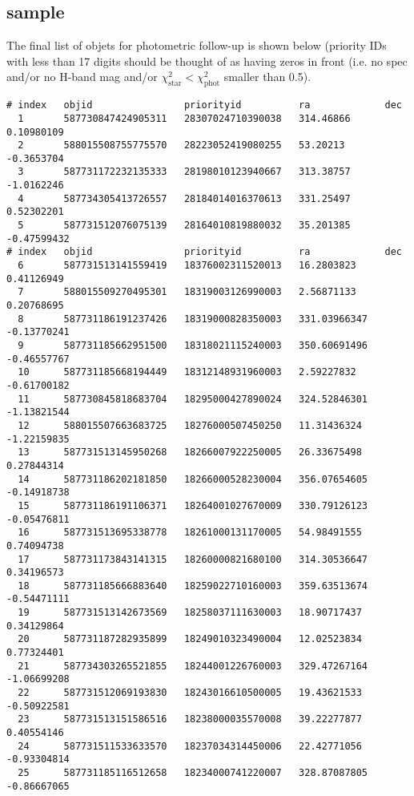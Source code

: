 \documentclass[a4paper,11pt]{article}
\begin{document}
\subsection{sample}
The final list of objets for photometric follow-up is shown below (priority
IDs with less than 17 digits should be thought of as having zeros in front
(i.e. no spec and/or no H-band mag and/or
$\chi_\textrm{star}^2<\chi_\textrm{phot}^2$ smaller than 0.5).
\begin{verbatim}
# index   objid                priorityid          ra             dec          
  1       587730847424905311   28307024710390038   314.46866      0.10980109   
  2       588015508755775570   28223052419080255   53.20213       -0.3653704   
  3       587731172232135333   28198010123940667   313.38757      -1.0162246   
  4       587734305413726557   28184014016370613   331.25497      0.52302201   
  5       587731512076075139   28164010819880032   35.201385      -0.47599432  
# index   objid                priorityid          ra             dec          
  6       587731513141559419   18376002311520013   16.2803823     0.41126949   
  7       588015509270495301   18319003126990003   2.56871133     0.20768695   
  8       587731186191237426   18319000828350003   331.03966347   -0.13770241  
  9       587731185662951500   18318021115240003   350.60691496   -0.46557767  
  10      587731185668194449   18312148931960003   2.59227832     -0.61700182  
  11      587730845818683704   18295000427890024   324.52846301   -1.13821544  
  12      588015507663683725   18276000507450250   11.31436324    -1.22159835  
  13      587731513145950268   18266007922250005   26.33675498    0.27844314   
  14      587731186202181850   18266000528230004   356.07654605   -0.14918738  
  15      587731186191106371   18264001027670009   330.79126123   -0.05476811  
  16      587731513695338778   18261000131170005   54.98491555    0.74094738   
  17      587731173843141315   18260000821680100   314.30536647   0.34196573   
  18      587731185666883640   18259022710160003   359.63513674   -0.54471111  
  19      587731513142673569   18258037111630003   18.90717437    0.34129864   
  20      587731187282935899   18249010323490004   12.02523834    0.77324401   
  21      587734303265521855   18244001226760003   329.47267164   -1.06699208  
  22      587731512069193830   18243016610500005   19.43621533    -0.50922581  
  23      587731513151586516   18238000035570008   39.22277877    0.40554146   
  24      587731511533633570   18237034314450006   22.42771056    -0.93304814  
  25      587731185116512658   18234000741220007   328.87087805   -0.86667065  

\end{verbatim}
\end{document}
